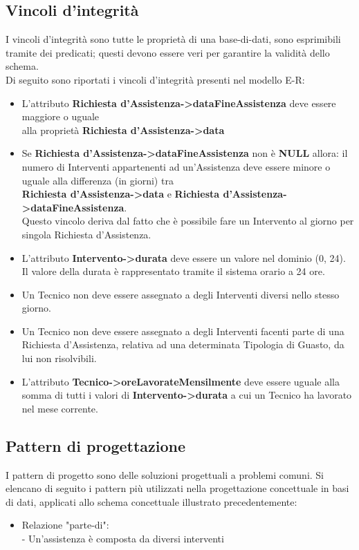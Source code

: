 \documentclass[legalpaper]{article}
\begin{document}
\subsection{Vincoli d'integrità}
I vincoli d'integrità sono tutte le proprietà di una base-di-dati, sono esprimibili 
tramite dei predicati; questi devono essere veri per garantire la validità dello schema.\\
\newline
Di seguito sono riportati i vincoli d'integrità presenti nel modello E-R:
\begin{itemize}
	\item L'attributo  \textbf{Richiesta d'Assistenza->dataFineAssistenza} deve essere maggiore o uguale\\
	alla proprietà \textbf{Richiesta d'Assistenza->data}
	\item Se   \textbf{Richiesta d'Assistenza->dataFineAssistenza} non è \textbf{NULL} allora: il numero di Interventi appartenenti ad un'Assistenza deve essere minore o uguale alla differenza (in giorni) tra \\  \textbf{Richiesta d'Assistenza->data} e   \textbf{Richiesta d'Assistenza->dataFineAssistenza}.\\Questo vincolo deriva dal fatto che è possibile fare un Intervento al giorno per singola Richiesta d'Assistenza.
	\item L'attributo  \textbf{Intervento->durata} deve essere un valore nel dominio (0, 24).
	Il valore della durata è rappresentato tramite il sistema orario a 24 ore.
	\item Un Tecnico non deve essere assegnato a degli Interventi diversi nello stesso giorno.
	\item Un Tecnico non deve essere assegnato a degli Interventi facenti parte di una Richiesta d'Assistenza, relativa ad una determinata Tipologia di Guasto, da lui non risolvibili.
	\item L'attributo  \textbf{Tecnico->oreLavorateMensilmente} deve essere uguale alla somma di tutti i valori di  \textbf{Intervento->durata} a cui un Tecnico ha lavorato nel mese corrente.

	
\end{itemize}

\subsection{Pattern di progettazione}
I pattern di progetto sono delle soluzioni progettuali a problemi comuni. Si elencano di seguito i pattern più utilizzati nella progettazione concettuale in basi di dati, applicati allo schema concettuale illustrato precedentemente:
\begin{itemize}
	\item Relazione "parte-di":\\
	- Un'assistenza è composta da diversi interventi

\end{itemize}
	
\end{document}
